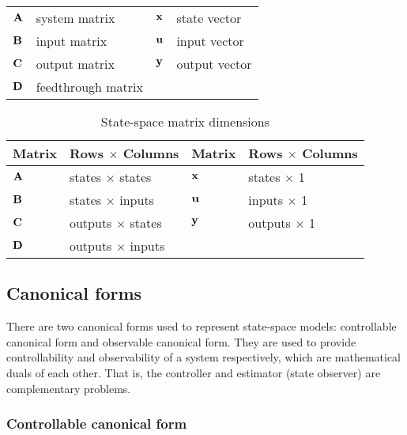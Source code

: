 \begin{center}
  \renewcommand{\arraystretch}{1.3}
  \begin{tabulary}{\linewidth}{LLLL}
    $\mathbf{A}$ & system matrix      & $\mathbf{x}$ & state vector \\
    $\mathbf{B}$ & input matrix       & $\mathbf{u}$ & input vector \\
    $\mathbf{C}$ & output matrix      & $\mathbf{y}$ & output vector \\
    $\mathbf{D}$ & feedthrough matrix &  &  \\
  \end{tabulary}
\end{center}

\begin{table}[h]
  \caption{State-space matrix dimensions}
  \renewcommand{\arraystretch}{1.5}
  \centering
  \begin{tabular}{|ll|ll|}
    \hline
    \rowcolor{lightblue}
    \textbf{Matrix} & \textbf{Rows $\times$ Columns} &
    \textbf{Matrix} & \textbf{Rows $\times$ Columns} \\
    \hline
    $\mathbf{A}$ & states $\times$ states & $\mathbf{x}$ & states $\times$ 1 \\
    $\mathbf{B}$ & states $\times$ inputs & $\mathbf{u}$ & inputs $\times$ 1 \\
    $\mathbf{C}$ & outputs $\times$ states & $\mathbf{y}$ & outputs $\times$ 1 \\
    $\mathbf{D}$ & outputs $\times$ inputs &  &  \\
    \hline
  \end{tabular}
  \label{tab:ss_matrix_dims}
\end{table}

\subsection{Canonical forms}

There are two canonical forms used to represent state-space \glspl{model}:
controllable canonical form and observable canonical form. They are used to
provide controllability and observability of a system respectively, which are
mathematical duals of each other. That is, the controller and estimator (state
observer) are complementary problems.

\subsubsection{Controllable canonical form} \label{subsubsec:ctrl-canon}


